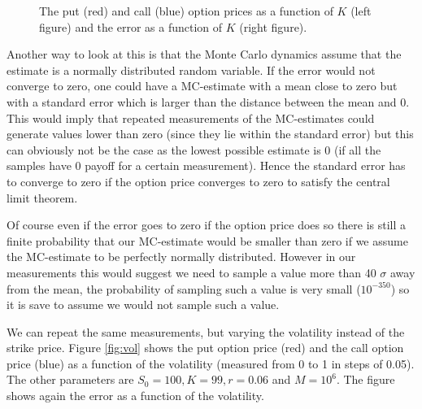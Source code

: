 \documentclass[11pt,a4paper]{article}
\begin{document}
\begin{figure}[H]
  \centering
  \caption{The put (red) and call (blue) option prices as a function of $K$ (left figure) and the error as a function of $K$ (right figure).}
  \label{fig:strike}
\end{figure}

Another way to look at this is that the Monte Carlo dynamics assume that the estimate is a normally distributed random variable. If the error would not converge to zero, one could have a MC-estimate with a mean close to zero but with a standard error which is larger than the distance between the mean and 0. This would imply that repeated measurements of the MC-estimates could generate values lower than zero (since they lie within the standard error) but this can obviously not be the case as the lowest possible estimate is 0 (if all the samples have 0 payoff for a certain measurement). Hence the standard error has to converge to zero if the option price converges to zero to satisfy the central limit theorem.

Of course even if the error goes to zero if the option price does so there is still a finite probability that our MC-estimate would be smaller than zero if we assume the MC-estimate to be perfectly normally distributed. However in our measurements this would suggest we need to sample a value more than 40 $\sigma$ away from the mean, the probability of sampling such a value is very small ($10^{-350}$) so it is save to assume we would not sample such a value.

We can repeat the same measurements, but varying the volatility instead of the strike price. Figure \ref{fig:vol} shows the put option price (red) and the call option price (blue) as a function of the volatility (measured from 0 to 1 in steps of 0.05). The other parameters are $S_0 = 100, K = 99, r = 0.06$ and $M = 10^6$. The figure shows again the error as a function of the volatility.
\end{document}
